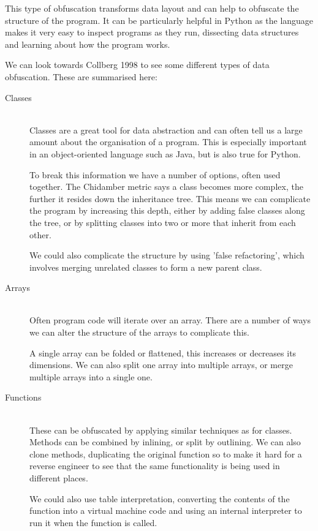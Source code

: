 \documentclass[twoside,a4paper]{report}
\begin{document}
This type of obfuscation transforms data layout and can help to obfuscate the structure of the program. It can be
particularly helpful in Python as the language makes it very easy to inspect programs as they run, dissecting data
structures and learning about how the program works.

We can look towards Collberg 1998 \cite{dataobf} to see some different types of data obfuscation. These are summarised here:

\begin{description}
\item[Classes] \hfill \\
Classes are a great tool for data abstraction and can often tell us a large amount about the organisation of a program. This is
especially important in an object-oriented language such as Java, but is also true for Python.

To break this information we have a number of options, often used together. The Chidamber metric says a class becomes more complex,
the further it resides down the inheritance tree. This means we can complicate the program by increasing this depth, either by adding
false classes along the tree, or by splitting classes into two or more that inherit from each other.

We could also complicate the structure by using 'false refactoring', which involves merging unrelated classes to form a new parent
class.

\item[Arrays] \hfill \\
Often program code will iterate over an array. There are a number of ways we can alter the structure of the arrays to complicate
this.

A single array can be folded or flattened, this increases or decreases its dimensions. We can also split one array into multiple
arrays, or merge multiple arrays into a single one.

\item[Functions] \hfill \\
These can be obfuscated by applying similar techniques as for classes. Methods can be combined by inlining, or split by outlining.
We can also clone methods, duplicating the original function so to make it hard for a reverse engineer to see that the same
functionality is being used in different places.

We could also use table interpretation, converting the contents of the function into a virtual machine code and using an internal
interpreter to run it when the function is called.


\end{description}
\end{document}
